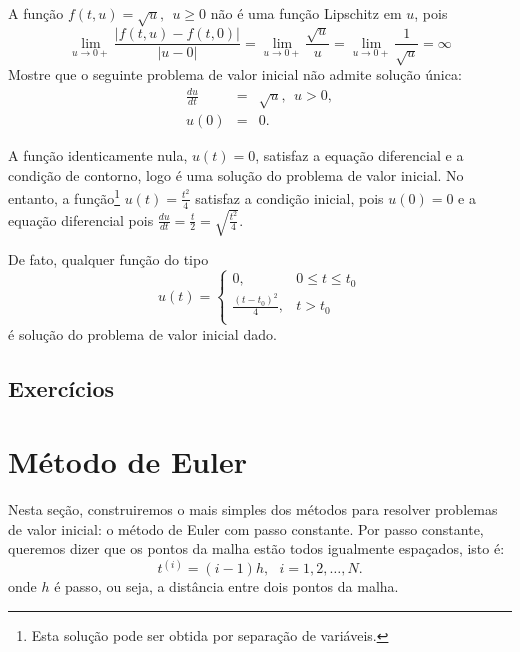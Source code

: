 \begin{exeresol} A função $f(t,u)=\sqrt{u},~~u\geq 0$ não é uma função Lipschitz em $u$, pois
\begin{equation} \lim_{u\to 0+} \frac{|f(t,u)-f(t,0)|}{|u-0|}=\lim_{u\to 0+} \frac{\sqrt{u}}{u}=\lim_{u\to 0+} \frac{1}{\sqrt{u}}=\infty \end{equation}
 Mostre que o seguinte problema de valor inicial não admite solução única:
\begin{eqnarray}
\frac{du}{dt} &=&\sqrt{u},~~u>0,\\
u(0) &=& 0.
\end{eqnarray}
\end{exeresol}
\begin{resol}
 A função identicamente nula, $u(t)=0$, satisfaz a equação diferencial e a condição de contorno, logo é uma solução do problema de valor inicial. No entanto, a função\footnote{Esta solução pode ser obtida por separação de variáveis.} $u(t)=\frac{t^2}{4}$ satisfaz a condição inicial, pois $u(0)=0$ e a equação diferencial pois $\frac{du}{dt}=\frac{t}{2}=\sqrt{\frac{t^2}{4}}$.

 De fato, qualquer função do tipo
 \begin{equation}u(t)=\left\{
 \begin{array}{ll}
  0,&0\leq t \leq t_0\\
  \frac{(t-t_0)^2}{4},& t >t_0\\
 \end{array}
 \right.\end{equation}
 é solução do problema de valor inicial dado.
\end{resol}

\subsection*{Exercícios}

\construirExer


\section{Método de Euler}\label{sec:euler}
Nesta seção, construiremos o mais simples dos métodos para resolver problemas de valor inicial: o método de Euler com passo constante. Por passo constante, queremos dizer que os pontos da malha estão todos igualmente espaçados, isto é:
\begin{equation} t^{(i)}=(i-1)h,~~~i=1,2,\ldots,N. \end{equation}
onde $h$ é passo, ou seja, a distância entre dois pontos da malha.


